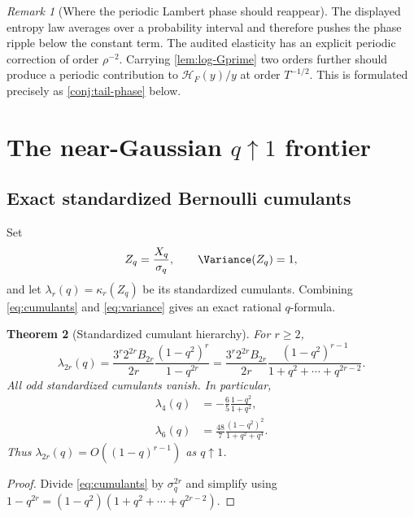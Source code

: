\documentclass[11pt,oneside]{article}
\newtheorem{theorem}{Theorem}[section]
\theoremstyle{definition}
\theoremstyle{remark}
\newtheorem{remark}[theorem]{Remark}
\begin{document}
\begin{remark}[Where the periodic Lambert phase should reappear]
The displayed entropy law averages over a probability interval and therefore
pushes the phase ripple below the constant term.  The audited elasticity has an
explicit periodic correction of order $\rho^{-2}$.  Carrying
\cref{lem:log-Gprime} two orders further should produce a periodic contribution
to $\mathscr H_F(y)/y$ at order $T^{-1/2}$.  This is formulated precisely as
\cref{conj:tail-phase} below.
\end{remark}

\section{The near-Gaussian $q\uparrow1$ frontier}
\label{sec:q-gaussian}

\subsection{Exact standardized Bernoulli cumulants}

Set
\begin{equation}
 Z_q=\frac{X_q}{\sigma_q},
 \qquad \Variance(Z_q)=1,
 \label{eq:Zq}
\end{equation}
and let $\lambda_r(q)=\kappa_r(Z_q)$ be its standardized cumulants.  Combining
\eqref{eq:cumulants} and \eqref{eq:variance} gives an exact rational $q$-formula.

\begin{theorem}[Standardized cumulant hierarchy]
\label{thm:standardized-cumulants}
For $r\ge2$,
\begin{equation}
 \boxed{
 \lambda_{2r}(q)
 =\frac{3^r2^{2r}B_{2r}}{2r}
   \frac{(1-q^2)^r}{1-q^{2r}}
 =\frac{3^r2^{2r}B_{2r}}{2r}
   \frac{(1-q^2)^{r-1}}{1+q^2+\cdots+q^{2r-2}}.}
 \label{eq:standardized-cumulants}
\end{equation}
All odd standardized cumulants vanish.  In particular,
\begin{align}
 \lambda_4(q)&=-\frac65\frac{1-q^2}{1+q^2},
 \label{eq:lambda4}\\
 \lambda_6(q)&=\frac{48}{7}
 \frac{(1-q^2)^2}{1+q^2+q^4}.
 \label{eq:lambda6}
\end{align}
Thus $\lambda_{2r}(q)=O((1-q)^{r-1})$ as $q\uparrow1$.
\end{theorem}

\begin{proof}
Divide \eqref{eq:cumulants} by $\sigma_q^{2r}$ and simplify using
$1-q^{2r}=(1-q^2)(1+q^2+\cdots+q^{2r-2})$.
\end{proof}
\end{document}

